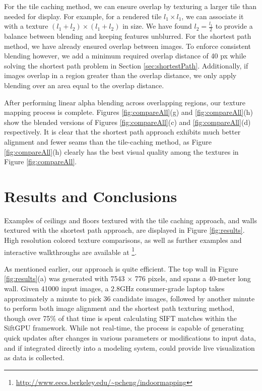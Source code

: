 \documentclass[]{spie}  %
\begin{document}
For the tile caching method, we can ensure overlap by texturing a
larger tile than needed for display. For example, for a rendered tile
$l_1 \times l_1$, we can associate it with a texture $(l_1 + l_2)
\times (l_1 + l_2)$ in size.  We have found $l_2 = \frac{l_1}{2}$ to
provide a balance between blending and keeping features unblurred. For
the shortest path method, we have already ensured overlap between
images. To enforce consistent blending however, we add a minimum
required overlap distance of 40 px while solving the shortest path
problem in Section \ref{sec:shortestPath}. Additionally, if images
overlap in a region greater than the overlap distance, we only apply
blending over an area equal to the overlap distance.

After performing linear alpha blending across overlapping regions, our
texture mapping process is complete. Figures \ref{fig:compareAll}(g)
and \ref{fig:compareAll}(h) show the blended versions of Figures
\ref{fig:compareAll}(c) and \ref{fig:compareAll}(d) respectively. It
is clear that the shortest path approach exhibits much better
alignment and fewer seams than the tile-caching method, as Figure
\ref{fig:compareAll}(h) clearly has the best visual quality among the
textures in Figure \ref{fig:compareAll}.

\section{Results and Conclusions}
\label{sec:resultsAndConclusions}
Examples of ceilings and floors textured with the tile caching
approach, and walls textured with the shortest path approach, are
displayed in Figure \ref{fig:results}. High resolution colored texture
comparisons, as well as further examples and interactive walkthroughs
are available at
\footnote{\url{http://www.eecs.berkeley.edu/~pcheng/indoormapping}}.

As mentioned earlier, our approach is quite efficient. The top wall in
Figure \ref{fig:results}(a) was generated with 7543 $\times$ 776
pixels, and spans a 40-meter long wall. Given 41000 input images, a
2.8GHz consumer-grade laptop takes approximately a minute to pick 36
candidate images, followed by another minute to perform both image
alignment and the shortest path texturing method, though over 75\% of
that time is spent calculating SIFT matches within the SiftGPU
framework. While not real-time, the process is capable of generating
quick updates after changes in various parameters or modifications to
input data, and if integrated directly into a modeling system, could
provide live visualization as data is collected.
\end{document}
